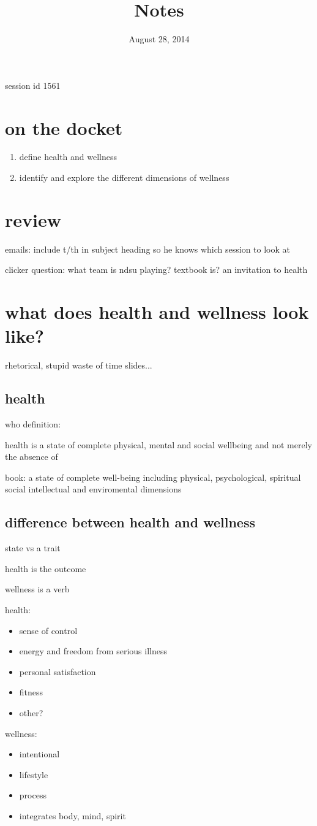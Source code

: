 \documentclass[letterpaper]{article}
\begin{document}
\title{Notes}
\date{August 28, 2014}
\maketitle
session id 1561

\section*{on the docket}
\begin{enumerate}
\item
define health and wellness
\item
identify and explore the different dimensions of wellness

\end{enumerate}
\section*{review}
emails: include t/th in subject heading so he knows which session to look at

clicker question: what team is ndsu playing? 
textbook is? an invitation to health

\section*{what does health and wellness look like?}
rhetorical, stupid waste of time slides...

\subsection*{health}
who definition:

health is a state of complete physical, mental and social wellbeing and not merely the absence of

book:
a state of complete well-being including physical, psychological, spiritual social intellectual and enviromental dimensions

\subsection*{difference between health and wellness}
state vs a trait

health is the outcome

wellness is a verb

health:
\begin{itemize}
\item
sense of control
\item
energy and freedom from serious illness
\item
personal satisfaction
\item
fitness
\item
other?
\end{itemize}
wellness:
\begin{itemize}
\item
intentional
\item
lifestyle
\item
process
\item
integrates body, mind, spirit
\end{itemize}
\end{document}

